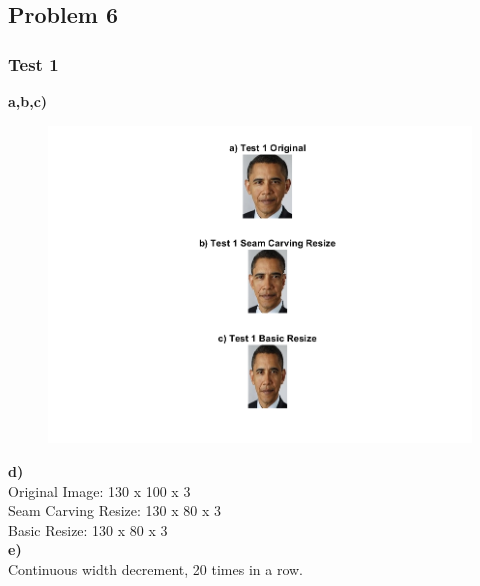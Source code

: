 \documentclass[12pt]{article}
\begin{document}
\newpage
\subsection*{Problem 6}
\subsubsection*{Test 1}
\textbf{a,b,c)}
\begin{figure}[H]
  \includegraphics[width=\linewidth]{PS1_Q6_1.png}
\end{figure}

\noindent
\textbf{d)} \\
Original Image: 130 x 100 x 3 \\
Seam Carving Resize: 130 x 80 x 3 \\
Basic Resize: 130 x 80 x 3 \\

\noindent
\textbf{e)} \\
Continuous width decrement, 20 times in a row. \\
\end{document}
